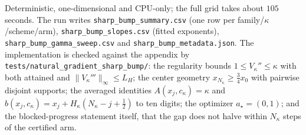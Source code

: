 \documentclass[11pt]{article}
\begin{document}
Deterministic, one-dimensional and CPU-only; the full grid takes about $105$
seconds. The run writes \texttt{sharp\_bump\_summary.csv} (one row per
family/$\kappa$/scheme/arm), \texttt{sharp\_bump\_slopes.csv} (fitted exponents),
\texttt{sharp\_bump\_gamma\_sweep.csv} and \texttt{sharp\_bump\_metadata.json}. The
implementation is checked against the appendix by
\texttt{tests/natural\_gradient\_sharp\_bump/}: the regularity bounds
$1\le V_\kappa''\le\kappa$ with both attained and $\|V_\kappa'''\|_\infty\le L_H$;
the center geometry $x_{N_\kappa}\ge\tfrac34x_0$ with pairwise disjoint supports;
the averaged identities $A(x_j,c_\kappa)=\kappa$ and
$b(x_j,c_\kappa)=x_j+H_\kappa(N_\kappa-j+\tfrac12)$ to ten digits; the optimizer
$a_\star=(0,1)$; and the blocked-progress statement itself, that the gap does not
halve within $N_\kappa$ steps of the certified arm.
\end{document}
